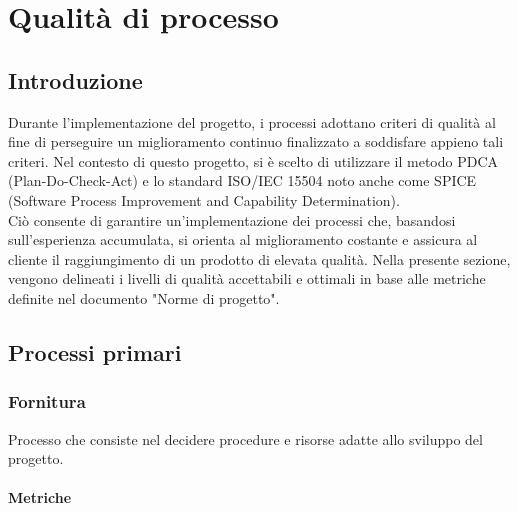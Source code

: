 \section{Qualità di processo}
\subsection{Introduzione}
Durante l'implementazione del progetto, i processi adottano criteri di qualità al fine di perseguire un miglioramento continuo finalizzato a soddisfare appieno tali criteri.
 Nel contesto di questo progetto, si è scelto di utilizzare il metodo PDCA (Plan-Do-Check-Act) e lo standard ISO/IEC 15504 noto anche come SPICE (Software Process Improvement and Capability Determination).
\\
Ciò consente di garantire un'implementazione dei processi che, basandosi sull'esperienza accumulata, si orienta al miglioramento costante e assicura al cliente il raggiungimento di un prodotto di elevata qualità. Nella presente sezione, vengono delineati i livelli di qualità accettabili e ottimali in base alle metriche definite nel documento "Norme di progetto".

\subsection{Processi primari}
\subsubsection{Fornitura}
Processo che consiste nel decidere procedure e risorse
adatte allo sviluppo del progetto.

\paragraph{Metriche}
